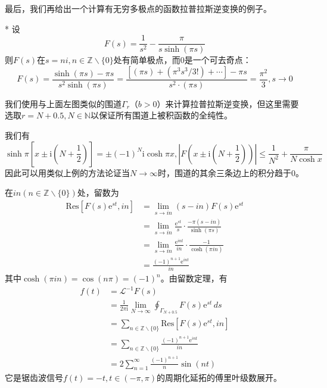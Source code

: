 最后，我们再给出一个计算有无穷多极点的函数拉普拉斯逆变换的例子\cite{folland}。
\begin{example}*
    设\[F(s)=\frac{1}{s^2}-\frac{\pi}{s\sinh(\pi s)}\]
    则$F(s)$在$s=ni,n\in\mathbb{Z}\backslash\{0\}$处有简单极点，而0是一个可去奇点：\[F(s)=\frac{\sinh(\pi s)-\pi s}{s^2 \sinh(\pi s)}=\frac{[(\pi s)+(\pi^3s^3/3!)+\cdots]-\pi s}{s^2 \cdot(\pi s)}=\frac{\pi^2}{3},s\to 0\]

    我们使用与上面左图类似的围道$\Gamma_r$（$b>0$）来计算拉普拉斯逆变换，但这里需要选取$r=N+0.5,N\in\mathbb{N} $以保证所有围道上被积函数的全纯性。

    我们有\[\sinh\pi\left[x\pm \mathrm{i}\left(N+\frac{1}{2}\right)\right]=\pm(-1)^N \mathrm{i}\cosh\pi x,\left|F\left(x\pm \mathrm{i}\left(N+\frac{1}{2}\right)\right)\right|\leq \frac{1}{N^2}+\frac{\pi}{N\cosh x}\]
    因此可以用类似上例的方法论证当$N\to\infty$时，围道的其余三条边上的积分趋于0。

    在$in(n\in\mathbb{Z}\backslash\{0\})$处，留数为
    \begin{align*}
        \text{Res}[F(s)\mathrm{e}^{st},in]&=\lim_{s\to in}(s-in)F(s)\mathrm{e}^{st}\\
        &=\lim_{s\to in}\frac{\mathrm{e}^{st}}{s}\cdot\frac{-\pi(s-in)}{\sinh(\pi s)}\\
        &=\lim_{s\to in}\frac{\mathrm{e}^{int}}{in}\cdot\frac{-1}{\cosh(\pi in)}\\
        &=\frac{(-1)^{n+1}\mathrm{e}^{int}}{in}
    \end{align*}
    其中$\cosh(\pi in)=\cos(n\pi)=(-1)^n$。由留数定理，有
    \begin{align*}
        f(t)&=\mathcal{L}^{-1} F(s)\\
        &=\frac{1}{2\pi \mathrm{i}}\lim_{N\to\infty}\oint_{\Gamma_{N+0.5}}F(s)\mathrm{e}^{st}\,ds\\
        &=\sum_{n\in\mathbb{Z}\backslash\{0\}}\text{Res}[F(s)\mathrm{e}^{st},in]\\
        &=\sum_{n\in\mathbb{Z}\backslash\{0\}}\frac{(-1)^{n+1}\mathrm{e}^{int}}{in}\\
        &=2\sum_{n=1}^{\infty}\frac{(-1)^{n+1}}{n}\sin(nt)
    \end{align*}
    它是锯齿波信号$f(t)=-t,t\in(-\pi,\pi)$的周期化延拓的傅里叶级数展开。
\end{example}
